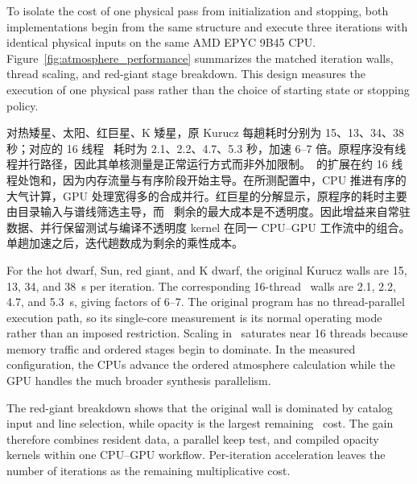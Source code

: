\begin{EN}
To isolate the cost of one physical pass from initialization and stopping, both
implementations begin from the same structure and execute three iterations with
identical physical inputs on the same AMD EPYC 9B45 CPU.
Figure~\ref{fig:atmosphere_performance} summarizes the matched iteration walls,
thread scaling, and red-giant stage breakdown. This design measures the
execution of one physical pass rather than the choice of starting state or
stopping policy.
\end{EN}

对热矮星、太阳、红巨星、K 矮星，原 Kurucz 每趟耗时分别为 15、13、34、38 秒；对应的 16 线程 \paynezero\ 耗时为 2.1、2.2、4.7、5.3 秒，加速 6--7 倍。原程序没有线程并行路径，因此其单核测量是正常运行方式而非外加限制。\paynezero\ 的扩展在约 16 线程处饱和，因为内存流量与有序阶段开始主导。在所测配置中，CPU 推进有序的大气计算，GPU 处理宽得多的合成并行。红巨星的分解显示，原程序的耗时主要由目录输入与谱线筛选主导，而 \paynezero\ 剩余的最大成本是不透明度。因此增益来自常驻数据、并行保留测试与编译不透明度 kernel 在同一 CPU--GPU 工作流中的组合。单趟加速之后，迭代趟数成为剩余的乘性成本。

\begin{EN}
For the hot dwarf, Sun, red giant, and K dwarf, the original Kurucz walls are
15, 13, 34, and 38~s per iteration. The corresponding 16-thread \paynezero\
walls are 2.1, 2.2, 4.7, and 5.3~s, giving factors of 6--7. The original
program has no thread-parallel execution path, so its single-core measurement
is its normal operating mode rather than an imposed restriction. Scaling in
\paynezero\ saturates near 16 threads because memory traffic and ordered stages
begin to dominate. In the measured configuration, the CPUs advance the ordered
atmosphere calculation while the GPU handles the much broader synthesis
parallelism.

The red-giant breakdown shows that the original wall is dominated by catalog
input and line selection, while opacity is the largest remaining \paynezero\
cost. The gain therefore combines resident data, a parallel keep test, and
compiled opacity kernels within one CPU--GPU workflow. Per-iteration
acceleration leaves the number of iterations as the remaining multiplicative
cost.
\end{EN}
